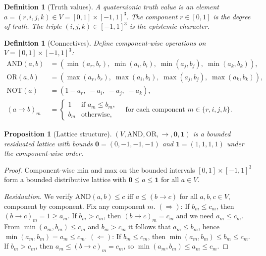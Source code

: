 \documentclass[11pt,a4paper]{article}
\newtheorem{proposition}[theorem]{Proposition}
\newtheorem{definition}[theorem]{Definition}
\newcommand{\rey}[1]{{\color{rcolor}#1}}
\newcommand{\imag}[1]{{\color{icolor}#1}}
\newcommand{\exac}[1]{{\color{jcolor}#1}}
\newcommand{\recu}[1]{{\color{kcolor}#1}}
\def\rey#1{#1}%
\def\imag#1{#1}%
\def\exac#1{#1}%
\def\recu#1{#1}%
\begin{document}
\begin{definition}[Truth values]
\label{def:truth}
A \emph{quaternionic truth value} is an element
$a=(\rey{r},\imag{i},\exac{j},\recu{k})\in V=[0,1]\times[-1,1]^3$.
The component $\rey{r}\in[0,1]$ is the \emph{degree of truth}.
The triple $(\imag{i},\exac{j},\recu{k})\in[-1,1]^3$ is the
\emph{epistemic character}.
\end{definition}

\begin{definition}[Connectives]
\label{def:connectives}
Define component-wise operations on $V=[0,1]\times[-1,1]^3$:
\begin{align}
  \mathrm{AND}(a,b) &= (\min(a_r,b_r),\;\min(a_i,b_i),\;\min(a_j,b_j),\;\min(a_k,b_k)), \\
  \mathrm{OR}(a,b) &= (\max(a_r,b_r),\;\max(a_i,b_i),\;\max(a_j,b_j),\;\max(a_k,b_k)), \\
  \mathrm{NOT}(a) &= (1-a_r,\;-a_i,\;-a_j,\;-a_k), \label{eq:not}\\
  (a\to b)_m &= \begin{cases}
    1 & \text{if } a_m\leq b_m,\\
    b_m & \text{otherwise,}
  \end{cases}
  \quad\text{for each component } m\in\{r,i,j,k\}. \label{eq:imp}
\end{align}
\end{definition}

\begin{proposition}[Lattice structure]
\label{prop:lattice}
$(V,\mathrm{AND},\mathrm{OR},\to,\mathbf{0},\mathbf{1})$
is a bounded residuated lattice with bounds
$\mathbf{0}=(0,-1,-1,-1)$ and $\mathbf{1}=(1,1,1,1)$
under the component-wise order.
\end{proposition}

\begin{proof}
Component-wise min and max on the bounded intervals
$[0,1]\times[-1,1]^3$ form a bounded distributive lattice with
$\mathbf{0}\leq a\leq\mathbf{1}$ for all $a\in V$.

\emph{Residuation.} We verify $\mathrm{AND}(a,b)\leq c$ iff
$a\leq(b\to c)$ for all $a,b,c\in V$, component by component.
Fix any component $m$.
$(\Rightarrow)$: If $b_m\leq c_m$, then $(b\to c)_m=1\geq a_m$.
If $b_m>c_m$, then $(b\to c)_m=c_m$ and we need $a_m\leq c_m$.
From $\min(a_m,b_m)\leq c_m$ and $b_m>c_m$ it follows that
$a_m\leq b_m$, hence $\min(a_m,b_m)=a_m\leq c_m$.
$(\Leftarrow)$: If $b_m\leq c_m$, then $\min(a_m,b_m)\leq b_m\leq c_m$.
If $b_m>c_m$, then $a_m\leq(b\to c)_m=c_m$, so
$\min(a_m,b_m)\leq a_m\leq c_m$.
\end{proof}
\end{document}
